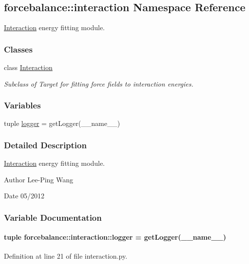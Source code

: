 \hypertarget{namespaceforcebalance_1_1interaction}{\subsection{forcebalance\-:\-:interaction \-Namespace \-Reference}
\label{namespaceforcebalance_1_1interaction}
}


\hyperlink{classforcebalance_1_1interaction_1_1Interaction}{\-Interaction} energy fitting module.  


\subsubsection*{\-Classes}
\begin{DoxyCompactItemize}
\item 
class \hyperlink{classforcebalance_1_1interaction_1_1Interaction}{\-Interaction}
\begin{DoxyCompactList}\small\item\em \-Subclass of \-Target for fitting force fields to interaction energies. \end{DoxyCompactList}\end{DoxyCompactItemize}
\subsubsection*{\-Variables}
\begin{DoxyCompactItemize}
\item 
tuple \hyperlink{namespaceforcebalance_1_1interaction_a4ec2dbe0f5ae3a35a22966a7c1ed81f0}{logger} = get\-Logger(\-\_\-\-\_\-name\-\_\-\-\_\-)
\end{DoxyCompactItemize}


\subsubsection{\-Detailed \-Description}
\hyperlink{classforcebalance_1_1interaction_1_1Interaction}{\-Interaction} energy fitting module. \begin{DoxyAuthor}{\-Author}
\-Lee-\/\-Ping \-Wang 
\end{DoxyAuthor}
\begin{DoxyDate}{\-Date}
05/2012 
\end{DoxyDate}


\subsubsection{\-Variable \-Documentation}
\hypertarget{namespaceforcebalance_1_1interaction_a4ec2dbe0f5ae3a35a22966a7c1ed81f0}{
\paragraph[{logger}]{\setlength{\rightskip}{0pt plus 5cm}tuple {\bf forcebalance\-::interaction\-::logger} = get\-Logger(\-\_\-\-\_\-name\-\_\-\-\_\-)}}\label{namespaceforcebalance_1_1interaction_a4ec2dbe0f5ae3a35a22966a7c1ed81f0}


\-Definition at line 21 of file interaction.\-py.

